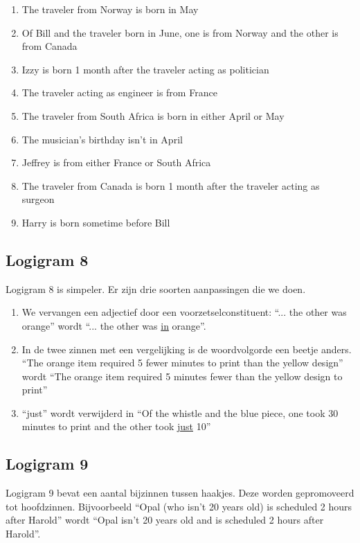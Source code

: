 \begin{enumerate}
  \item The traveler from Norway is born in May
  \item Of Bill and the traveler born in June, one is from Norway and the other is from Canada
  \item Izzy is born 1 month after the traveler acting as politician
  \item The traveler acting as engineer is from France
  \item The traveler from South Africa is born in either April or May
  \item The musician's birthday isn't in April
  \item Jeffrey is from either France or South Africa
  \item The traveler from Canada is born 1 month after the traveler acting as surgeon
  \item Harry is born sometime before Bill
\end{enumerate}

\subsection{Logigram 8}
Logigram 8 is simpeler. Er zijn drie soorten aanpassingen die we doen.

\begin{enumerate}
  \item We vervangen een adjectief door een voorzetselconstituent: ``... the other was orange'' wordt ``... the other was \underline{in} orange''.
  \item In de twee zinnen met een vergelijking is de woordvolgorde een beetje anders. ``The orange item required 5 fewer minutes to print than the yellow design'' wordt ``The orange item required 5 minutes fewer than the yellow design to print''
  \item ``just'' wordt verwijderd in ``Of the whistle and the blue piece, one took 30 minutes to print and the other took \underline{just} 10''
\end{enumerate}

\subsection{Logigram 9}
Logigram 9 bevat een aantal bijzinnen tussen haakjes. Deze worden gepromoveerd tot hoofdzinnen. Bijvoorbeeld ``Opal (who isn't 20 years old) is scheduled 2 hours after Harold'' wordt ``Opal isn't 20 years old and is scheduled 2 hours after Harold''.


